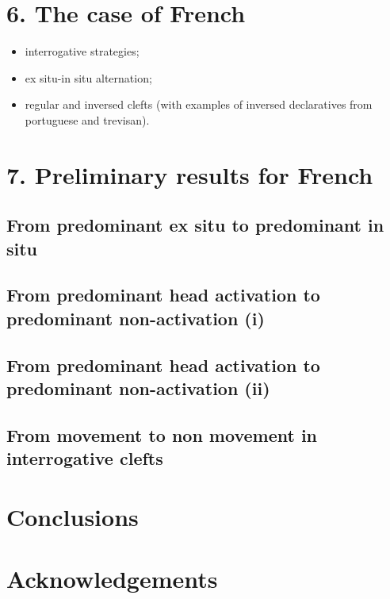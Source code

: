 \documentclass[fleqn,10pt]{wlscirep}
\begin{document}
\section*{6. The case of French}

\begin{itemize}
    \item interrogative strategies;
    \item ex situ-in situ alternation;
    \item regular and inversed clefts (with examples of inversed declaratives from portuguese and trevisan).
    \end{itemize}

\section*{7. Preliminary results for French}

\subsection*{From predominant ex situ to predominant in situ}

\subsection*{From predominant head activation to predominant non-activation (i)}

\subsection*{From predominant head activation to predominant non-activation (ii)}

\subsection*{From movement to non movement in interrogative clefts}

\section*{Conclusions}




\section*{Acknowledgements}
\end{document}
